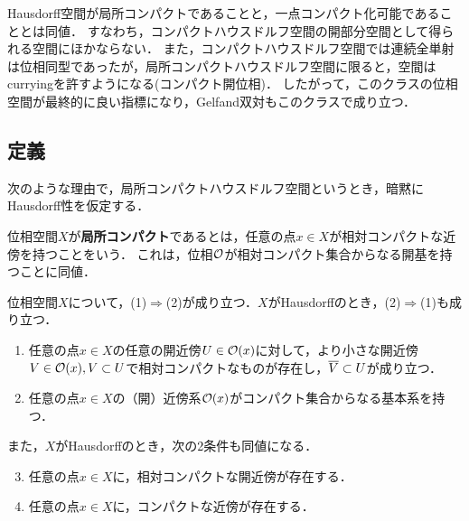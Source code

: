 \documentclass[uplatex,dvipdfmx]{jsreport}
\begin{document}
\begin{tcolorbox}[colframe=ForestGreen, colback=ForestGreen!10!white,breakable,colbacktitle=ForestGreen!40!white,coltitle=black,fonttitle=\bfseries\sffamily,
title=]
    Hausdorff空間が局所コンパクトであることと，一点コンパクト化可能であることとは同値．
    すなわち，コンパクトハウスドルフ空間の開部分空間として得られる空間にほかならない．
    また，コンパクトハウスドルフ空間では連続全単射は位相同型であったが，局所コンパクトハウスドルフ空間に限ると，空間はcurryingを許すようになる(コンパクト開位相)．
    したがって，このクラスの位相空間が最終的に良い指標になり，Gelfand双対もこのクラスで成り立つ．
\end{tcolorbox}

\subsection{定義}

\begin{tcolorbox}[colframe=ForestGreen, colback=ForestGreen!10!white,breakable,colbacktitle=ForestGreen!40!white,coltitle=black,fonttitle=\bfseries\sffamily,
title=]
    次のような理由で，局所コンパクトハウスドルフ空間というとき，暗黙にHausdorff性を仮定する．
\end{tcolorbox}

\begin{definition}
    位相空間$X$が\textbf{局所コンパクト}であるとは，任意の点$x\in X$が相対コンパクトな近傍を持つことをいう．
    これは，位相$\mathcal{O}$が相対コンパクト集合からなる開基を持つことに同値．
\end{definition}

\begin{proposition}[Hausdorffな場合の特徴付け]
    位相空間$X$について，(1)$\Rightarrow$(2)が成り立つ．$X$がHausdorffのとき，(2)$\Rightarrow$(1)も成り立つ．
    \begin{enumerate}
        \item 任意の点$x\in X$の任意の開近傍$U\in\mathcal{O}(x)$に対して，より小さな開近傍$V\in\mathcal{O}(x),V\subset U$で相対コンパクトなものが存在し，$\overline{V}\subset U$が成り立つ．
        \item 任意の点$x\in X$の（開）近傍系$\mathcal{O}(x)$がコンパクト集合からなる基本系を持つ．
    \end{enumerate}
    また，$X$がHausdorffのとき，次の2条件も同値になる．
    \begin{enumerate}\setcounter{enumi}{2}
        \item 任意の点$x\in X$に，相対コンパクトな開近傍が存在する．
        \item 任意の点$x\in X$に，コンパクトな近傍が存在する．
    \end{enumerate}
\end{proposition}
\end{document}
